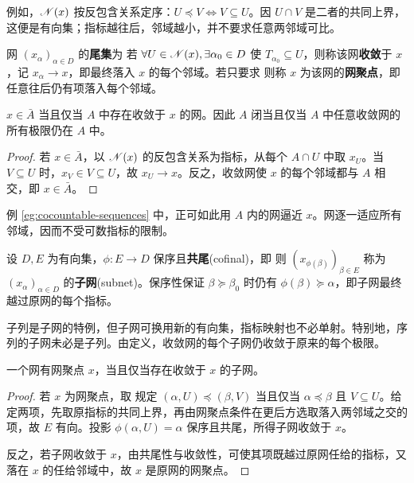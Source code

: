 例如，$\mathscr N(x)$ 按反包含关系定序：$U\preceq V\iff V\subseteq U$。因 $U\cap V$ 是二者的共同上界，这便是有向集；指标越往后，邻域越小，并不要求任意两邻域可比。

\begin{definition}
    网 $(x_\alpha)_{\alpha\in D}$ 的\textbf{尾集}为
    若 $\forall U\in\mathscr N(x),\exists\alpha_0\in D$ 使 $T_{\alpha_0}\subseteq U$，则称该网\textbf{收敛}于 $x$，记 $x_\alpha\to x$，即最终落入 $x$ 的每个邻域。若只要求
    则称 $x$ 为该网的\textbf{网聚点}，即任意往后仍有项落入每个邻域。
\end{definition}

\begin{theorem}\label{thm:net-closure}
    $x\in\bar A$ 当且仅当 $A$ 中存在收敛于 $x$ 的网。因此 $A$ 闭当且仅当 $A$ 中任意收敛网的所有极限仍在 $A$ 中。
\end{theorem}
\begin{proof}
    若 $x\in\bar A$，以 $\mathscr N(x)$ 的反包含关系为指标，从每个 $A\cap U$ 中取 $x_U$。当 $V\subseteq U$ 时，$x_V\in V\subseteq U$，故 $x_U\to x$。反之，收敛网使 $x$ 的每个邻域都与 $A$ 相交，即 $x\in\bar A$。
\end{proof}

例 \ref{eg:cocountable-sequences} 中，正可如此用 $A$ 内的网逼近 $x$。网逐一适应所有邻域，因而不受可数指标的限制。

\begin{definition}
    设 $D,E$ 为有向集，$\phi:E\to D$ 保序且\textbf{共尾}(cofinal)，即
    则 $(x_{\phi(\beta)})_{\beta\in E}$ 称为 $(x_\alpha)_{\alpha\in D}$ 的\textbf{子网}(subnet)。保序性保证 $\beta\succeq\beta_0$ 时仍有 $\phi(\beta)\succeq\alpha$，即子网最终越过原网的每个指标。
\end{definition}

子列是子网的特例，但子网可换用新的有向集，指标映射也不必单射。特别地，序列的子网未必是子列。由定义，收敛网的每个子网仍收敛于原来的每个极限。

\begin{theorem}\label{thm:net-cluster-subnet}
    一个网有网聚点 $x$，当且仅当存在收敛于 $x$ 的子网。
\end{theorem}
\begin{proof}
    若 $x$ 为网聚点，取
    规定 $(\alpha,U)\preceq(\beta,V)$ 当且仅当 $\alpha\preceq\beta$ 且 $V\subseteq U$。给定两项，先取原指标的共同上界，再由网聚点条件在更后方选取落入两邻域之交的项，故 $E$ 有向。投影 $\phi(\alpha,U)=\alpha$ 保序且共尾，所得子网收敛于 $x$。

    反之，若子网收敛于 $x$，由共尾性与收敛性，可使其项既越过原网任给的指标，又落在 $x$ 的任给邻域中，故 $x$ 是原网的网聚点。
\end{proof}

